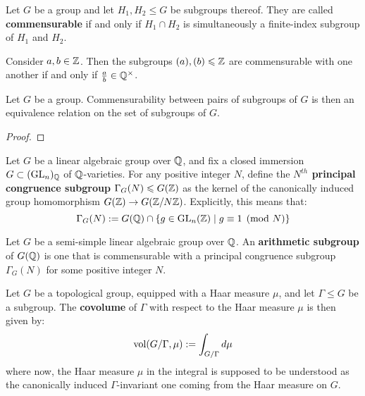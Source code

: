             \begin{definition} \label{def: commensurable_subgroups}
                Let $G$ be a group and let $H_1, H_2 \leq G$ be subgroups thereof. They are called \textbf{commensurable} if and only if $H_1 \cap H_2$ is simultaneously a finite-index subgroup of $H_1$ and $H_2$.
            \end{definition}
            \begin{example}
                Consider $a, b \in \mathbb{Z}$. Then the subgroups $(a), (b) \leqslant \mathbb{Z}$ are commensurable with one another if and only if $\frac{a}{b} \in \Q^{\x}$.
            \end{example}
            \begin{proposition} \label{prop: commensurability_is_an_equivalence_relation}
                Let $G$ be a group. Commensurability between pairs of subgroups of $G$ is then an equivalence relation on the set of subgroups of $G$.
            \end{proposition}
                \begin{proof}
                    
                \end{proof}
            \begin{definition} \label{def: principal_congruence_subgroups}
                Let $G$ be a linear algebraic group over $\mathbb{Q}$, and fix a closed immersion $G \subset (\operatorname{GL}_n)_{\mathbb{Q}}$ of $\mathbb{Q}$-varieties. For any positive integer $N$, define the \textbf{$N^{th}$ principal congruence subgroup} $\Gamma_G(N) \leqslant G(\mathbb{Z})$ as the kernel of the canonically induced group homomorphism $G(\mathbb{Z}) \to G(\mathbb{Z}/N\mathbb{Z})$. Explicitly, this means that:
                    $$\Gamma_G(N) := G(\mathbb{Q}) \cap \{g \in \operatorname{GL}_n(\mathbb{Z}) \mid g \equiv 1 \pmod{N}\}$$
            \end{definition}
            \begin{definition} \label{def: arithmetic_subgroups}
                Let $G$ be a semi-simple linear algebraic group over $\mathbb{Q}$. An \textbf{arithmetic subgroup} of $G(\mathbb{Q})$ is one that is commensurable with a principal congruence subgroup $\Gamma_G(N)$ for some positive integer $N$.
            \end{definition}
            \begin{definition}[Covolumes] \label{def: covolumes}
                Let $G$ be a  topological group, equipped with a Haar measure $\mu$, and let $\Gamma \leq G$ be a  subgroup. The \textbf{covolume} of $\Gamma$ with respect to the Haar measure $\mu$ is then given by:
                    $$\mathrm{vol}(G/\Gamma, \mu) := \int_{G/\Gamma} d\mu$$
                where now, the Haar measure $\mu$ in the integral is supposed to be understood as the canonically induced $\Gamma$-invariant one coming from the Haar measure on $G$.
            \end{definition}
